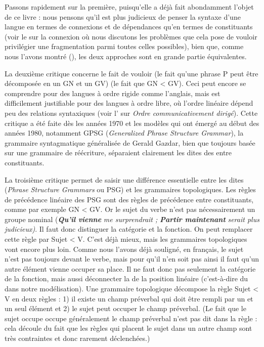 {    Passons rapidement sur la première, puisqu’elle a déjà fait abondamment l’objet de ce livre : nous pensons qu’il est plus judicieux de penser la syntaxe d’une langue en termes de connexions et de dépendances qu’en termes de constituants (voir le  sur la connexion où nous discutons les problèmes que cela pose de vouloir privilégier une fragmentation parmi toutes celles possibles), bien que, comme nous l’avons montré (), les deux approches sont en grande partie équivalentes.

    La deuxième critique concerne le fait de vouloir  (le fait qu’une phrase P peut être décomposée en un GN et un GV)  (le fait que GN < GV). Ceci peut encore se comprendre pour des langues à ordre rigide comme l’anglais, mais est difficilement justifiable pour des langues à ordre libre, où l’ordre linéaire dépend peu des relations syntaxiques (voir l’ sur \textit{Ordre communicativement dirigé}). Cette critique a été faite dès les années 1970 et les modèles qui ont émergé au début des années 1980, notamment GPSG (\textit{Generalized Phrase Structure Grammar}), la grammaire syntagmatique généralisée de Gerald Gazdar, bien que toujours basée sur une grammaire de réécriture, séparaient clairement les dites des  entre constituants.

    La troisième critique permet de saisir une différence essentielle entre les  dites  (\textit{Phrase Structure Grammars} ou PSG) et les grammaires topologiques. Les règles de précédence linéaire des PSG sont des règles de précédence entre constituants, comme par exemple GN < GV. Or le sujet du verbe n’est pas nécessairement un groupe nominal (\textbf{\textit{Qu’il} \textit{vienne}} \textit{me surprendrait ;} \textbf{\textit{Partir maintenant}} \textit{serait plus judicieux)}. Il faut donc distinguer la catégorie et la fonction. On peut remplacer cette règle par Sujet < V. C’est déjà mieux, mais les grammaires topologiques vont encore plus loin. Comme nous l’avons déjà souligné, en français, le sujet n’est pas toujours devant le verbe, mais pour qu’il n’en soit pas ainsi il faut qu’un autre élément vienne occuper sa place. Il ne faut donc pas seulement  la catégorie de la fonction, mais aussi déconnecter la  de la position linéaire (c'est-à-dire du  dans notre modélisation). Une grammaire topologique décompose la règle Sujet < V en deux règles : 1) il existe un champ préverbal qui doit être rempli par un et un seul élément et 2) le sujet peut occuper le champ préverbal. (Le fait que le sujet occupe occupe généralement le champ préverbal n'est pas dit dans la règle : cela découle du fait que les règles qui placent le sujet dans un autre champ sont très contraintes et donc rarement déclenchées.)
}
